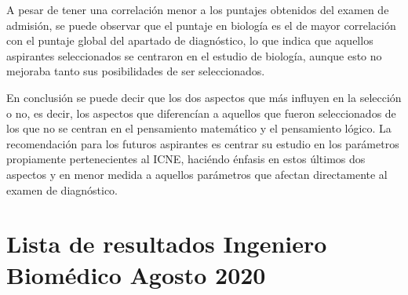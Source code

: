 \documentclass{article}
\begin{document}
A pesar de tener una correlación menor a los puntajes obtenidos del examen de admisión, se puede observar que el puntaje en biología es el de mayor correlación con el puntaje global del apartado de diagnóstico, lo que indica que aquellos aspirantes seleccionados se centraron en el estudio de biología, aunque esto no mejoraba tanto sus posibilidades de ser seleccionados.

En conclusión se puede decir que los dos aspectos que más influyen en la selección o no, es decir, los aspectos que diferencían a aquellos que fueron seleccionados de los que no se centran en el pensamiento matemático y el pensamiento lógico. La recomendación para los futuros aspirantes es centrar su estudio en los parámetros propiamente pertenecientes al ICNE, haciéndo énfasis en estos últimos dos aspectos y en menor medida a aquellos parámetros que afectan directamente al examen de diagnóstico.

\newpage

\appendix

\section{Lista de resultados Ingeniero Biomédico Agosto 2020}
\end{document}
